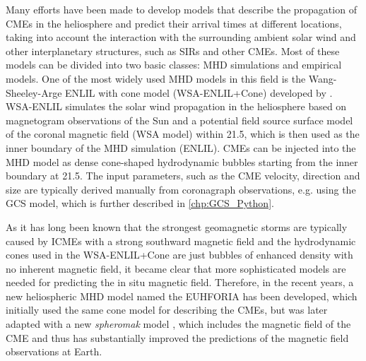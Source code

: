 Many efforts have been made to develop models that describe the propagation of \acp{CME} in the heliosphere and predict their arrival times at different locations, taking into account the interaction with the surrounding ambient solar wind and other interplanetary structures, such as \acp{SIR} and other \acp{CME}. Most of these models can be divided into two basic classes: \ac{MHD} simulations and empirical models. One of the most widely used \ac{MHD} models in this field is the Wang-Sheeley-Arge ENLIL with cone model (WSA-ENLIL+Cone) developed by \citet{Odstrcil-2004}. WSA-ENLIL simulates the solar wind propagation in the heliosphere based on magnetogram observations of the Sun and a potential field source surface model of the coronal magnetic field (WSA model) within \SI{21.5}{\solarradius}, which is then used as the inner boundary of the \ac{MHD} simulation (ENLIL). CMEs can be injected into the \ac{MHD} model as dense cone-shaped hydrodynamic bubbles starting from the inner boundary at \SI{21.5}{\solarradius}. The input parameters, such as the \ac{CME} velocity, direction and size are typically derived manually from coronagraph observations, e.g. using the \acl{GCS} \citep[\acs{GCS},][]{Thernisien-2011-GCS} model, which is further described in \autoref{chp:GCS_Python}.

As it has long been known that the strongest geomagnetic storms are typically caused by \acp{ICME} with a strong southward magnetic field \citep[negative $B_z$, see e.g.][]{Russell-1974} and the hydrodynamic cones used in the WSA-ENLIL+Cone are just bubbles of enhanced density with no inherent magnetic field, it became clear that more sophisticated models are needed for predicting the in situ magnetic field.
Therefore, in the recent years, a new heliospheric \ac{MHD} model named the \acl{EUHFORIA} \citep[\acs{EUHFORIA},][]{Pomoell-2018} has been developed, which initially used the same cone model for describing the \acp{CME}, but was later adapted with a new \textit{spheromak} model \citep{Scolini-2019}, which includes the magnetic field of the \ac{CME} and thus has substantially improved the predictions of the magnetic field observations at Earth.

